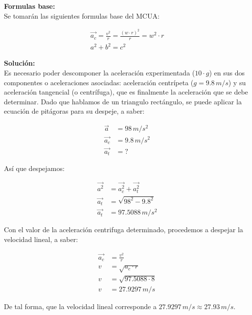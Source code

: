 \documentclass[11pt,letterpaper]{article}
\begin{document}
\textbf{Formulas base:}\\

Se tomarán las siguientes formulas base del MCUA:

\begin{align}
\boxed{ \vec{a_{c}} = \frac{v^2}{r} = \frac{(w \cdot r)^2}{r} = w^2 \cdot r}\\
\boxed{ a^2 + b^2 = c^2 }
\end{align}

\textbf{Solución:}\\

Es necesario poder descomponer la aceleración experimentada ($10 \cdot g$) en sus dos componentes o aceleraciones asociadas: aceleración centrípeta ($g = 9.8\,m/s$) y su aceleración tangencial (o centrífuga), que es finalmente la aceleración que se debe determinar. Dado que hablamos de un triangulo rectángulo, se puede aplicar la ecuación de pitágoras para su despeje, a saber:

\begin{align*}
\vec{a} &= 98\,m/s^2\\
\vec{a_{c}} &= 9.8\,m/s^2\\
\vec{a_{t}} &= ?
\end{align*}

Así que despejamos:

\begin{align*}
\vec{a^2} &= \vec{a_{c}^2} + \vec{a_{t}^2}\\
\vec{a_{t}} &= \sqrt{98^2 - 9.8^2}\\
\vec{a_{t}} &= 97.5088\,m/s^2
\end{align*}

Con el valor de la aceleración centrifuga determinado, procedemos a despejar la velocidad lineal, a saber:

\begin{align*}
\vec{a_{c}} &= \frac{v^2}{r}\\
v &= \sqrt{a_{c} \cdot r}\\
v &= \sqrt{97.5088 \cdot 8}\\
v &= 27.9297\,m/s
\end{align*}

De tal forma, que la velocidad lineal corresponde a $27.9297\,m/s \approx 27.93\,m/s$.

\end{document}
